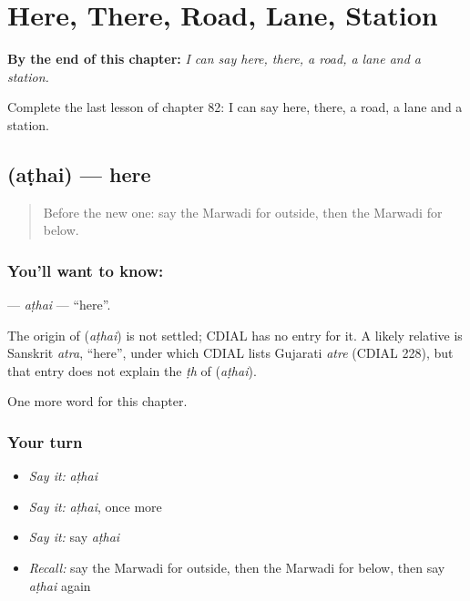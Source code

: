 
\chapter{Here, There, Road, Lane, Station}
\label{ch:mw-here-there-road-lane-station}

\begin{chapteropening}
\textbf{By the end of this chapter:} \emph{I can say here, there, a road, a lane and a station.}

Complete the last lesson of chapter 82: I can say here, there, a road, a lane and a station.
\end{chapteropening}

\section[\texorpdfstring{\mw{अठै} (aṭhai)}{अठै (aṭhai)}]{ (aṭhai) — here}

\label{lesson:MW-C82-athai}



\begin{quote}
Before the new one: say the Marwadi for outside, then the Marwadi for below.
\end{quote}

\subsection*{You'll want to know: }
\textbf{} — \emph{aṭhai} — \textquotedblleft{}here\textquotedblright{}.

\begin{cousinweb}
The origin of \textbf{} (\emph{aṭhai}) is not settled; CDIAL has no entry for it. A likely relative is Sanskrit \emph{atra}, \textquotedblleft{}here\textquotedblright{}, under which CDIAL lists Gujarati \emph{atre} (CDIAL 228), but that entry does not explain the \emph{ṭh} of \textbf{} (\emph{aṭhai}).
\end{cousinweb}

\begin{grammarlens}[title={What you've built}]
One more word for this chapter.
\end{grammarlens}

\subsection*{Your turn}
\begin{itemize}
\raggedright
  \item \emph{Say it:} \emph{aṭhai}
  \item \emph{Say it:} \emph{aṭhai}, once more
  \item \emph{Say it:} say \emph{aṭhai}
  \item \emph{Recall:} say the Marwadi for outside, then the Marwadi for below, then say \emph{aṭhai} again
\end{itemize}

